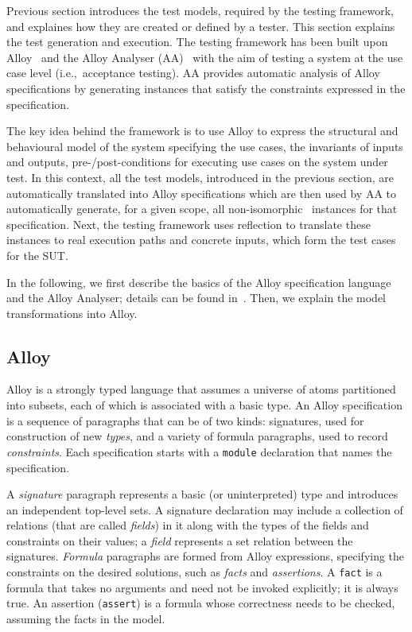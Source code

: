 %
%
\label{sec:test-generation-execution}
Previous section introduces the test models, required by the testing framework, and explaines how they are created or defined by a tester. This section explains the test generation and execution. The testing framework has been built upon Alloy~\cite{Jackson2002} and the Alloy Analyser (AA)~\cite{Jackson2000} with the aim of testing a system at the use case level (i.e.,\ acceptance testing). AA provides automatic analysis of Alloy specifications by generating instances that satisfy the constraints expressed in the specification.

The key idea behind the framework is to use Alloy to express the structural and behavioural model of the system specifying the use cases, the invariants of inputs and outputs, pre-/post-conditions for executing use cases on the system under test. In this context, all the test models, introduced in the previous section, are automatically translated into Alloy specifications which are then used by AA to automatically generate, for a given scope, all non-isomorphic~\cite{Shlyakhter2007} instances for that specification. Next, the testing framework uses reflection to translate these instances to real execution paths and concrete inputs, which form the test cases for the SUT.

In the following, we first describe the basics of the Alloy specification language and the Alloy Analyser; details can be found in~\cite{Jackson2000,Jackson2002,Jackson2012}. Then, we explain the model transformations into Alloy.

\subsection{Alloy}
\label{sec:test-generation-execution-alloy}
Alloy is a strongly typed language that assumes a universe of atoms partitioned into subsets, each of which is associated with a basic type. An Alloy specification is a sequence of paragraphs that can be of two kinds: signatures, used for construction of new \textit{types}, and a variety of formula paragraphs, used to record \textit{constraints}. Each specification starts with a \texttt{module} declaration that names the specification.%

A \textit{signature} paragraph represents a basic (or uninterpreted) type and introduces an independent top-level sets. A signature declaration may include a collection of relations (that are called \textit{fields}) in it along with the types of the fields and constraints on their values; a \textit{field} represents a set relation between the signatures. \textit{Formula} paragraphs are formed from Alloy expressions, specifying the constraints on the desired solutions, such as \textit{facts} and \textit{assertions}. A \texttt{fact} is a formula that takes no arguments and need not be invoked explicitly; it is always true. An assertion (\texttt{assert}) is a formula whose correctness needs to be checked, assuming the facts in the model. 

